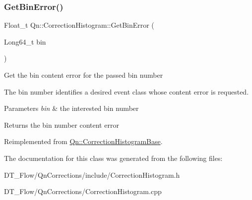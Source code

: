 \subsubsection{\texorpdfstring{Get\+Bin\+Error()}{GetBinError()}}
{\footnotesize\ttfamily Float\+\_\+t Qn\+::\+Correction\+Histogram\+::\+Get\+Bin\+Error (\begin{DoxyParamCaption}\item[{Long64\+\_\+t}]{bin }\end{DoxyParamCaption})\hspace{0.3cm}{\ttfamily [virtual]}}

Get the bin content error for the passed bin number

The bin number identifies a desired event class whose content error is requested.


\begin{DoxyParams}{Parameters}
{\em bin} & the interested bin number \\
\hline
\end{DoxyParams}
\begin{DoxyReturn}{Returns}
the bin number content error 
\end{DoxyReturn}


Reimplemented from \mbox{\hyperlink{classQn_1_1CorrectionHistogramBase_a50a7dd4c5bbe5e4d0e405365c2a9104d}{Qn\+::\+Correction\+Histogram\+Base}}.



The documentation for this class was generated from the following files\+:\begin{DoxyCompactItemize}
\item 
D\+T\+\_\+\+Flow/\+Qn\+Corrections/include/Correction\+Histogram.\+h\item 
D\+T\+\_\+\+Flow/\+Qn\+Corrections/Correction\+Histogram.\+cpp\end{DoxyCompactItemize}
